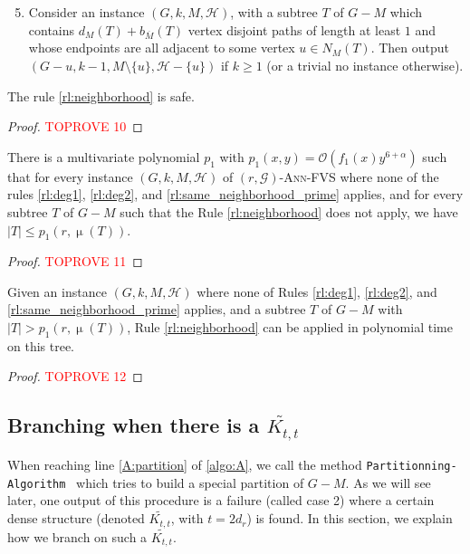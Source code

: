 \documentclass{amsart}
\newcommand{\KR}[1]{KR$_ #1$}
\newcommand{\algopart }{\texttt{Partitionning-Algorithm}~ }
\newcommand{\G}{\mathcal{G}}
\newcommand{\bom}{b_{\overline{M}}}
\newcommand{\mH}{\mathcal{H}}
\newcommand{\KttTilde}{\widetilde{K_{t,t}}}
\DeclareMathOperator\db{\mu}
\newcommand{\AFVS}{\textsc{$(r,\G)$-Ann-FVS}\xspace}
\newcommand{\ruleref}[1]{\hyperref[#1]{\ref*{#1}}}
\renewcommand{\O}{\mathcal{O}}
\begin{document}
\begin{enumerate}[label=(\KR{{\arabic*}})]
\setcounter{enumi}{4}
\item \label{rl:neighborhood} Consider an instance $(G, k, M, \mH)$, with a subtree $T$ of $G-M$ which contains $d_M(T)+\bom(T)$ vertex disjoint paths of length at least $1$ and whose endpoints are all adjacent to some vertex $u\in N_M(T)$. Then output $\left(G-u, k-1, M\setminus\{u\}, \mH-\{u\}\right)$ if $k \ge 1$ (or a trivial no instance otherwise).
\end{enumerate}

\begin{lemma}
    The rule \ruleref{rl:neighborhood} is safe.
\end{lemma}
\begin{proof}\textcolor{red}{TOPROVE 10}\end{proof}



\begin{lemma}\label{lem:subtree-size}
There is a multivariate polynomial $p_1$ with $p_1(x,y) = \O(f_1(x) y^{6+\alpha})$ such that for every instance $(G,k,M,\mH)$ of \AFVS where none of the rules \ruleref{rl:deg1}, \ruleref{rl:deg2}, and \ruleref{rl:same_neighborhood_prime} applies, and for every subtree $T$ of $G-M$ such that the Rule \ruleref{rl:neighborhood} does not apply, we have $|T| \le p_1(r,\db(T))$.
\end{lemma}

\begin{proof}\textcolor{red}{TOPROVE 11}\end{proof}

\begin{corollary}\label{lm:boundSzT}
    Given an instance $(G,k, M, \mH)$ where none of Rules \ruleref{rl:deg1}, \ruleref{rl:deg2}, and \ruleref{rl:same_neighborhood_prime} applies, and a subtree $T$ of $G-M$ with $|T|> p_1(r,\db(T))$, Rule \ruleref{rl:neighborhood} can be applied in polynomial time on this tree.
\end{corollary}
\begin{proof}\textcolor{red}{TOPROVE 12}\end{proof}

\subsection{Branching when there is a \texorpdfstring{$\KttTilde$}{K~tt}} \label{sec:ktttilde}


When reaching line \ref{A:partition} of \autoref{algo:A}, we call the method \algopart which tries to build a special partition of $G-M$. As we will see later, one output of this procedure is a failure (called case 2) where a certain dense structure (denoted $\KttTilde$, with $t=2d_r$) is found.
In this section, we explain how we branch on such a $\KttTilde$.
\end{document}
